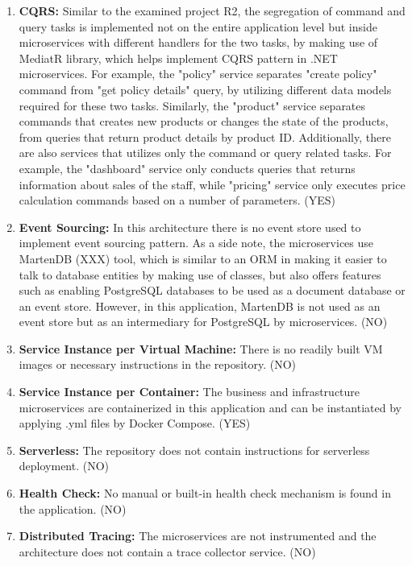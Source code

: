 \documentclass{Configuration_Files/PoliMi3i_thesis}
\begin{document}
\begin{enumerate}
    \item \textbf{CQRS:} Similar to the examined project R2, the segregation of command and query tasks is implemented not on the entire application level but inside microservices with different handlers for the two tasks, by making use of MediatR library, which helps implement CQRS pattern in .NET microservices.
    For example, the "policy" service separates "create policy" command from "get policy details" query, by utilizing different data models required for these two tasks.
    Similarly, the "product" service separates commands that creates new products or changes the state of the products, from queries that return product details by product ID.
    Additionally, there are also services that utilizes only the command or query related tasks.
    For example, the "dashboard" service only conducts queries that returns information about sales of the staff, while "pricing" service only executes price calculation commands based on a number of parameters. (YES)
    
    \item \textbf{Event Sourcing:} In this architecture there is no event store used to implement event sourcing pattern.
    As a side note, the microservices use MartenDB (XXX) tool, which is similar to an ORM in making it easier to talk to database entities by making use of classes, but also offers features such as enabling PostgreSQL databases to be used as a document database or an event store.
    However, in this application, MartenDB is not used as an event store but as an intermediary for PostgreSQL by microservices. (NO)
    
    \item \textbf{Service Instance per Virtual Machine:} There is no readily built VM images or necessary instructions in the repository. (NO)
    
    \item \textbf{Service Instance per Container:} The business and infrastructure microservices are containerized in this application and can be instantiated by applying .yml files by Docker Compose. (YES)
    
    \item \textbf{Serverless:} The repository does not contain instructions for serverless deployment. (NO)
    
    \item \textbf{Health Check:} No manual or built-in health check mechanism is found in the application. (NO)
    
    \item \textbf{Distributed Tracing:} The microservices are not instrumented and the architecture does not contain a trace collector service. (NO)
    

\end{enumerate}
\end{document}
